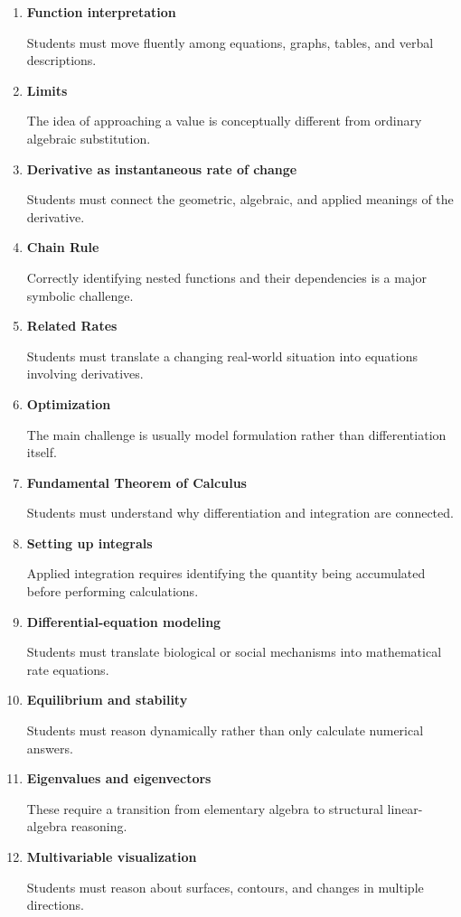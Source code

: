 \documentclass[11pt]{article}
\begin{document}
\begin{enumerate}
    \item \textbf{Function interpretation}
    
    Students must move fluently among equations, graphs, tables,
    and verbal descriptions.
    
    \item \textbf{Limits}
    
    The idea of approaching a value is conceptually different from
    ordinary algebraic substitution.
    
    \item \textbf{Derivative as instantaneous rate of change}
    
    Students must connect the geometric, algebraic, and applied
    meanings of the derivative.
    
    \item \textbf{Chain Rule}
    
    Correctly identifying nested functions and their dependencies
    is a major symbolic challenge.
    
    \item \textbf{Related Rates}
    
    Students must translate a changing real-world situation into
    equations involving derivatives.
    
    \item \textbf{Optimization}
    
    The main challenge is usually model formulation rather than
    differentiation itself.
    
    \item \textbf{Fundamental Theorem of Calculus}
    
    Students must understand why differentiation and integration
    are connected.
    
    \item \textbf{Setting up integrals}
    
    Applied integration requires identifying the quantity being
    accumulated before performing calculations.
    
    \item \textbf{Differential-equation modeling}
    
    Students must translate biological or social mechanisms into
    mathematical rate equations.
    
    \item \textbf{Equilibrium and stability}
    
    Students must reason dynamically rather than only calculate
    numerical answers.
    
    \item \textbf{Eigenvalues and eigenvectors}
    
    These require a transition from elementary algebra to structural
    linear-algebra reasoning.
    
    \item \textbf{Multivariable visualization}
    
    Students must reason about surfaces, contours, and changes in
    multiple directions.
\end{enumerate}
\end{document}
